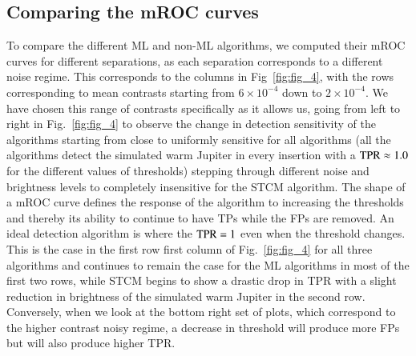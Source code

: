 \documentclass{aa}
\begin{document}
\subsection{Comparing the mROC curves}
\label{sec:roc}

To compare the different ML and non-ML algorithms, we computed their mROC curves for different separations, as each separation corresponds to a different noise regime.
This corresponds to the columns in Fig~\ref{fig:fig_4}, with the rows corresponding to mean contrasts starting from $6\times10^{-4}$ down to $2\times10^{-4}$.
We have chosen this range of contrasts specifically as it allows us, going from left to right in Fig.~\ref{fig:fig_4} to observe the change in detection sensitivity of the algorithms starting from close to uniformly sensitive for all algorithms (all the algorithms detect the simulated warm Jupiter in every insertion with a ${\rm TPR}\approx 1.0$ for the different values of thresholds) stepping through different noise and brightness levels to completely insensitive for the STCM algorithm.
The shape of a mROC curve defines the response of the algorithm to increasing the thresholds and thereby its ability to continue to have TPs while the FPs are removed.
An ideal detection algorithm is where the ${\rm TPR}=1$ even when the threshold changes.
This is the case in the first row first column of Fig.~\ref{fig:fig_4} for all three algorithms and continues to remain the case for the ML algorithms in most of the first two rows, while STCM begins to show a drastic drop in TPR with a slight reduction in brightness of the simulated warm Jupiter in the second row.
Conversely, when we look at the bottom right set of plots, which correspond to the higher contrast noisy regime, a decrease in threshold will produce more FPs but will also produce higher TPR. 
\end{document}
